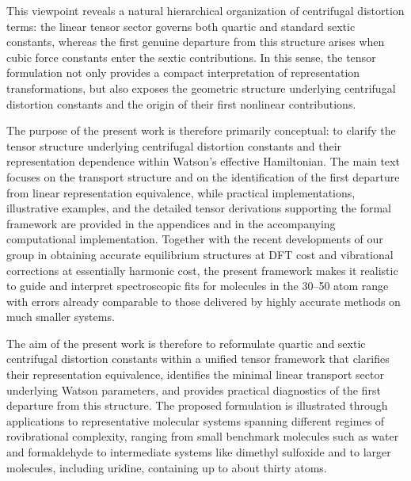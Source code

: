 This viewpoint reveals a natural hierarchical organization of
centrifugal distortion terms: the linear tensor sector governs both
quartic and standard sextic constants, whereas the first genuine
departure from this structure arises when cubic force constants enter
the sextic contributions. In this sense, the tensor formulation not
only provides a compact interpretation of representation
transformations, but also exposes the geometric structure underlying
centrifugal distortion constants and the origin of their first
nonlinear contributions.

The purpose of the present work is therefore primarily conceptual: to
clarify the tensor structure underlying centrifugal distortion
constants and their representation dependence within Watson's effective
Hamiltonian. The main text focuses on the transport structure and on
the identification of the first departure from linear representation
equivalence, while practical implementations, illustrative examples,
and the detailed tensor derivations supporting the formal framework
are provided in the appendices and in the accompanying computational
implementation. Together with the recent developments of our group in
obtaining accurate equilibrium structures at DFT cost and vibrational
corrections at essentially harmonic cost, the present framework makes
it realistic to guide and interpret spectroscopic fits for molecules in
the 30--50 atom range with errors already comparable to those delivered
by highly accurate methods on much smaller systems.

The aim of the present work is therefore to reformulate quartic and sextic
centrifugal distortion constants within a unified tensor framework that
clarifies their representation equivalence, identifies the minimal linear
transport sector underlying Watson parameters, and provides practical
diagnostics of the first departure from this structure. The proposed
formulation is illustrated through applications to representative
molecular systems spanning different regimes of rovibrational complexity,
ranging from small benchmark molecules such as water and formaldehyde to
intermediate systems like dimethyl sulfoxide and to larger molecules,
including uridine, containing up to about thirty atoms.
